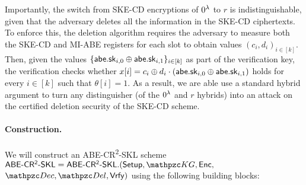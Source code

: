 Importantly, the switch from SKE-CD encryptions of $0^\lambda$ to $r$ is
indistinguishable, given that the adversary deletes all the information
in the SKE-CD ciphertexts.  To enforce this, the deletion algorithm
requires the adversary to measure both the SKE-CD and MI-ABE registers
for each slot to obtain values $(c_i, d_i)_{i \in [k]}$. Then, given
the values $\{\mathsf{abe}.\mathsf{sk}_{i, 0} \oplus \mathsf{abe}.\mathsf{sk}_{i, 1}\}_{i \in [k]}$ as
part of the verification key, the verification checks whether $x[i] =
c_i \oplus d_i \cdot (\mathsf{abe}.\mathsf{sk}_{i, 0} \oplus \mathsf{abe}.\mathsf{sk}_{i, 1})$ holds for
every $i \in [k]$ such that $\theta[i] = 1$. As a result, we are able
use a standard hybrid argument to turn any distinguisher (of the
$0^\lambda$ and $r$ hybrids) into an attack on the certified deletion
security of the SKE-CD scheme.





\paragraph{Construction.}
We will construct an ABE-CR\textsuperscript{2}-SKL
scheme $\ABECRCRSKL = \ABECRCRSKL.(\Setup, \qKG, \Enc,$ $\qDec,
\qDel, \Vrfy)$ using the following building blocks:

